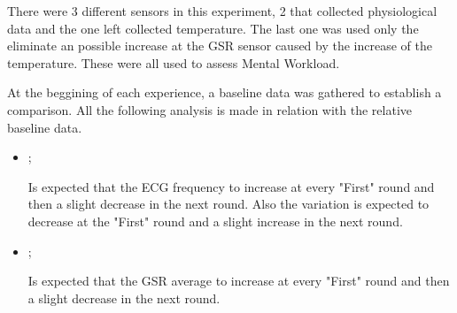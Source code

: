 There were 3 different sensors in this experiment, 2 that collected physiological data and the one left collected temperature. The last one was used only the eliminate an possible increase at the GSR sensor caused by the increase of the temperature. These were all used to assess Mental Workload.

At the beggining of each experience, a baseline data was gathered to establish a comparison. All the following analysis is made in relation with the relative baseline data.

\begin{itemize}
    \item {};
    
        Is expected that the ECG frequency to increase at every "First" round and then a slight decrease in the next round. Also the variation is expected to decrease at the "First" round and a slight increase in the next round.

    \item {};
    
        Is expected that the GSR average to increase at every "First" round and then a slight decrease in the next round.

\end{itemize}


